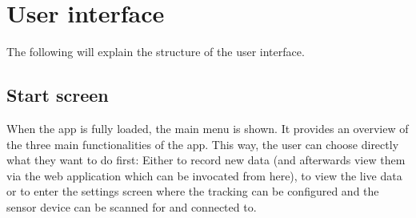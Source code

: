 \section{User interface}

The following will explain the structure of the user interface. 



\subsection{Start screen}

\begin{minipage}{0.45\textwidth}
When the app is fully loaded, the main menu is shown. It provides an overview of the three main functionalities of the app. This way, the user can choose directly what they want to do first:
Either to record new data (and afterwards view them via the web application which can be invocated from here), to view the live data or to enter the settings screen where the tracking can be configured and the sensor device can be scanned for and connected to.
\end{minipage} \hfill
\begin{minipage}{0.5\textwidth}
\end{minipage}

